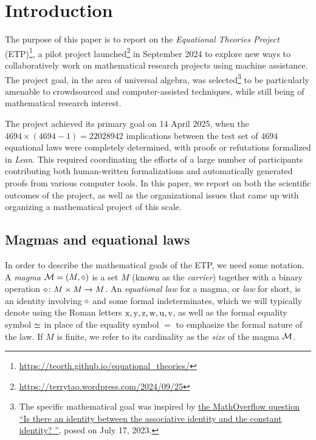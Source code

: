 \section{Introduction}

The purpose of this paper is to report on the \emph{Equational Theories Project} (ETP)\footnote{\url{https://teorth.github.io/equational_theories/}}, a pilot project launched\footnote{\url{https://terrytao.wordpress.com/2024/09/25}} in September 2024 to explore new ways to collaboratively work on mathematical research projects using machine assistance. The project goal, in the area of universal algebra, was selected\footnote{The specific mathematical goal was inspired by \href{https://mathoverflow.net/questions/450930}{the MathOverflow question ``Is there an identity between the associative identity and the constant identity?
''}, posed on July 17, 2023.} to be particularly amenable to crowdsourced and computer-assisted techniques, while still being of mathematical research interest.

The project achieved its primary goal on 14 April 2025, when the $\num{4694} \times (\num{4694}-1) = \num{22028942}$ implications between the test set of $\num{4694}$ equational laws were completely determined, with proofs or refutations formalized in \emph{Lean}.  This required coordinating the efforts of a large number of participants contributing both human-written formalizations and automatically generated proofs from various computer tools.  In this paper, we report on both the scientific outcomes of the project, as well as the organizational issues that came up with organizing a mathematical project of this scale.

\subsection{Magmas and equational laws}

In order to describe the mathematical goals of the ETP, we need some notation. A \emph{magma} ${\mathcal{M}} = (M,\diamond)$ is a set $M$ (known as the \emph{carrier}) together with a binary operation $\diamond \colon M \times M \to M$. An \emph{equational law} for a magma, or \emph{law} for short, is an identity involving $\diamond$ and some formal indeterminates, which we will typically denote using the Roman letters $\mathrm{x},\mathrm{y},\mathrm{z},\mathrm{w},\mathrm{u},\mathrm{v}$, as well as the formal equality symbol $\simeq$ in place of the equality symbol $=$ to emphasize the formal nature of the law.  If $M$ is finite, we refer to its cardinality as the \emph{size} of the magma ${\mathcal{M}}$.

